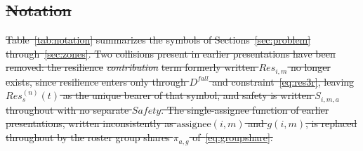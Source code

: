 \documentclass[utf8]{FrontiersinHarvard}
\providecommand{\DIFdel}[1]{{\protect\color{red}\sout{#1}}}                      %
\providecommand{\DIFdelbegin}{} %
\begin{document}
	\DIFdelbegin \subsection{\DIFdel{Notation}}
\addtocounter{subsection}{-1}%

\DIFdel{Table~\ref{tab:notation} summarizes the symbols of Sections~\ref{sec:problem} through~\ref{sec:zones}.
	Two collisions present in earlier presentations have been removed: the resilience }\textit{\DIFdel{contribution}} %
\DIFdel{term formerly written $Res_{i,m}$ no longer exists, since resilience enters only through $D^{fall}$ and constraint~\eqref{eq:res3r}, leaving $Res^{(n)}_s(t)$ as the unique bearer of that symbol, and safety is written $S_{i,m,a}$ throughout with no separate $Safety$. The single-assignee function of earlier presentations, written inconsistently as $\mathrm{assignee}(i,m)$ and $g(i,m)$, is replaced throughout by the roster group shares $\pi_{a,g}$ of~\eqref{eq:groupshare}.
	}%
\end{document}

